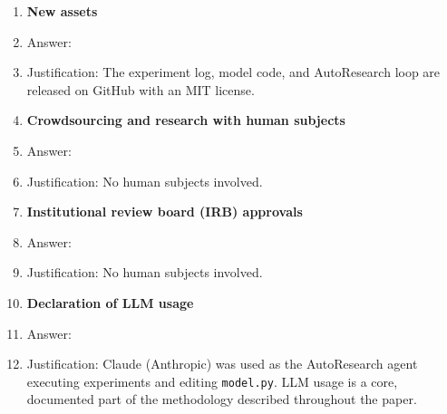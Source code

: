 \documentclass{article}
\begin{document}
\begin{enumerate}
\item {\bf New assets}
    \item[] Answer: \answerYes{}
    \item[] Justification: The experiment log, model code, and AutoResearch loop are
    released on GitHub with an MIT license.

\item {\bf Crowdsourcing and research with human subjects}
    \item[] Answer: \answerNA{}
    \item[] Justification: No human subjects involved.

\item {\bf Institutional review board (IRB) approvals}
    \item[] Answer: \answerNA{}
    \item[] Justification: No human subjects involved.

\item {\bf Declaration of LLM usage}
    \item[] Answer: \answerYes{}
    \item[] Justification: Claude (Anthropic) was used as the AutoResearch agent
    executing experiments and editing \texttt{model.py}. LLM usage is a core,
    documented part of the methodology described throughout the paper.

\end{enumerate}
\end{document}
